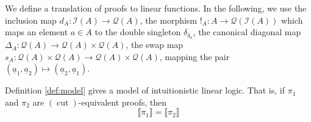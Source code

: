 \documentclass[runningheads]{llncs}
\newcommand{\call}[1]{\mathcal{#1}}
\newcommand{\Ical}{\call{I}}
\newcommand{\Qcal}{\call{Q}}
\newcommand{\lto}{\longrightarrow}
\newcommand{\cut}{(\operatorname{cut})}
\begin{document}
\begin{definition}\label{def:model}
We define a translation of proofs to linear functions. In the following, we use the inclusion map $d_A: \Ical(A) \lto \Qcal(A)$, the morphism $!_A: A \lto \Qcal(\Ical(A))$ which maps an element $a \in A$ to the double singleton $\delta_{\delta_a}$, the canonical diagonal map $\Delta_A: \Qcal(A) \lto \Qcal(A) \times \Qcal(A)$, the swap map $s_A: \Qcal(A) \times \Qcal(A) \lto \Qcal(A) \times \Qcal(A)$, mapping the pair $(\underline{a}_1, \underline{a}_2) \mapsto (\underline{a}_2, \underline{a}_1)$.
\end{definition}

\begin{theorem}
Definition \ref{def:model} gives a model of intuitionistic linear logic. That is, if $\pi_1$ and $\pi_2$ are $\cut$-equivalent proofs, then
\begin{equation}
\llbracket \pi_1 \rrbracket = \llbracket \pi_2 \rrbracket
\end{equation}
\end{theorem}
\end{document}
